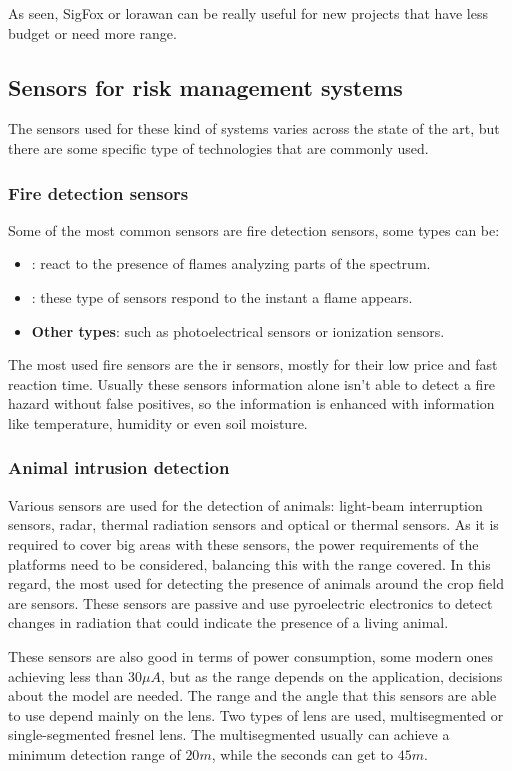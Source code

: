 As seen, SigFox or \acrshort{lorawan} can be really useful for new projects that have less budget or need more range.

\subsection{Sensors for risk management systems}
The sensors used for these kind of systems varies across the state of the art, but there are some specific type of technologies 
that are commonly used.
\subsubsection*{Fire detection sensors}
Some of the most common sensors are fire detection sensors, some types can be:
\begin{itemize}
    \item \textbf{}: react to the presence of flames analyzing parts of the spectrum.
    \item \textbf{}: these type of sensors respond to the instant a flame appears.
    \item \textbf{Other types}: such as photoelectrical sensors or ionization sensors.
\end{itemize}

The most used fire sensors are the \acrshort{ir} sensors, mostly for their low price and fast reaction time. Usually these sensors information 
alone isn't able to detect a fire hazard without false positives, so the information is enhanced with information like temperature, humidity or even 
soil moisture.
\subsubsection*{Animal intrusion detection}

Various sensors are used for the detection of animals: light-beam interruption sensors, radar, thermal radiation sensors and optical or thermal sensors. 
As it is required to cover big areas with these sensors, the power requirements of the platforms need to be considered, balancing this with the range covered. 
In this regard, the most used for detecting the presence of animals around the crop field are  sensors. These sensors are passive and use pyroelectric electronics to 
detect changes in radiation that could indicate the presence of a living animal. 

These sensors are also good in terms of power consumption, some modern ones achieving less than $30 \mu A$\cite{astind250613}, but as the range depends on the application, decisions about the model 
are needed. The range and the angle that this sensors are able to use depend mainly on the lens. Two types of lens are used, multisegmented or single-segmented fresnel lens.
The multisegmented usually can achieve a minimum detection range of $20 m$, while the seconds can get to $45 m$\cite{IoTSensorNetwork}.


